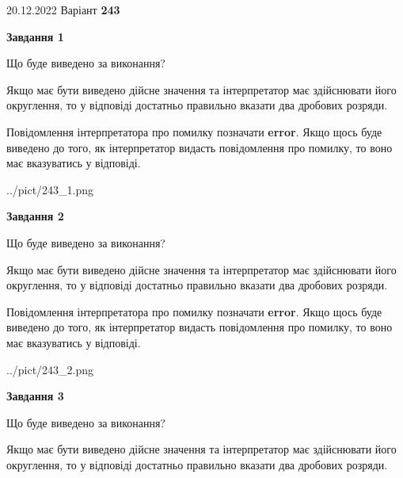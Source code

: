 \documentclass[12pt, ukrainian]{article}
\begin{document}
{20.12.2022 Варіант \No \textbf { 243 }\par}
{
\begin {Large}

{\begin {center}\textbf{Завдання 1}\end {center}}\par
Що буде виведено за виконання? \par

Якщо має бути виведено дійсне значення та інтерпретатор має здійснювати його округлення, 
то у відповіді достатньо правильно вказати два дробових розряди.

Повідомлення інтерпретатора про помилку позначати \textbf{error}.
Якщо щось буде виведено до того, як інтерпретатор видасть повідомлення про помилку, 
то воно має вказуватись у відповіді. \par

\begin{center}
	{../pict/243_1.png}
\end{center}
\newpage

{\begin {center}\textbf{Завдання 2}\end {center}}\par
Що буде виведено за виконання? \par

Якщо має бути виведено дійсне значення та інтерпретатор має здійснювати його округлення, 
то у відповіді достатньо правильно вказати два дробових розряди.

Повідомлення інтерпретатора про помилку позначати \textbf{error}.
Якщо щось буде виведено до того, як інтерпретатор видасть повідомлення про помилку, 
то воно має вказуватись у відповіді. \par

\begin{center}
	{../pict/243_2.png}
\end{center}
\newpage

{\begin {center}\textbf{Завдання 3}\end {center}}\par
Що буде виведено за виконання? \par

Якщо має бути виведено дійсне значення та інтерпретатор має здійснювати його округлення, 
то у відповіді достатньо правильно вказати два дробових розряди.


\end{Large}}
\end{document}
